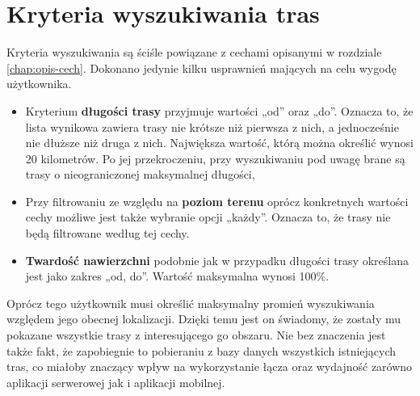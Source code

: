 \section{Kryteria wyszukiwania tras}\label{chap:kryteria}
Kryteria wyszukiwania są ściśle powiązane z cechami opisanymi w rozdziale \ref{chap:opis-cech}. Dokonano jedynie kilku usprawnień mających na celu wygodę użytkownika.
\begin{itemize}
\item{Kryterium \textbf{długości trasy} przyjmuje wartości „od” oraz „do”. Oznacza to, że lista wynikowa zawiera trasy nie krótsze niż pierwsza z nich, a jednocześnie nie dłuższe niż druga z nich. Największa wartość, którą można określić wynosi 20 kilometrów.  Po jej przekroczeniu, przy wyszukiwaniu pod uwagę brane są trasy o nieograniczonej maksymalnej długości,}
\item{Przy filtrowaniu ze względu na \textbf{poziom terenu} oprócz konkretnych wartości cechy możliwe jest także wybranie opcji „każdy”. Oznacza to, że trasy nie będą filtrowane według tej cechy.}
\item{\textbf{Twardość nawierzchni} podobnie jak w przypadku długości trasy określana jest jako zakres  „od, do”. Wartość maksymalna wynosi 100\%.}
\end{itemize}
Oprócz tego użytkownik musi określić maksymalny promień wyszukiwania względem jego obecnej lokalizacji. Dzięki temu jest on świadomy, że zostały mu pokazane wszystkie trasy z interesującego go obszaru. Nie bez znaczenia jest także fakt, że zapobiegnie to pobieraniu z bazy danych wszystkich istniejących tras, co miałoby znaczący wpływ na wykorzystanie łącza oraz wydajność zarówno aplikacji serwerowej jak i aplikacji mobilnej.